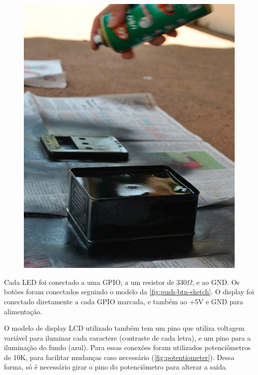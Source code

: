 \documentclass[
		12pt,				%
		openright,			%
		oneside,			%
		a4paper,			%
		chapter=TITLE,		%
		english,			%
		brazil				%
	]{abntex2}
\begin{document}
\begin{figure}[htb]
\begin{minipage}{0.45\textwidth}
		\includegraphics[width=1\textwidth]{img/pintar-2.jpg}
	\end{minipage}
\end{figure}

Cada LED foi conectado a uma GPIO, a um resistor de 330$\Omega$, e ao GND. Os botões foram conectados seguindo o modelo da \autoref{fig:push-btn-sketch}. O display foi conectado diretamente a cada GPIO marcada, e também ao +5V e GND para alimentação. 

O modelo de display LCD utilizado também tem um pino que utiliza voltagem variável para iluminar cada caractere (contraste de cada letra), e um pino para a iluminação do fundo (azul). Para essas conexões foram utilizados potenciômetros de 10K, para facilitar mudanças caso necessário (\autoref{fig:potentiometer}). Dessa forma, só é necessário girar o pino do potenciômetro para alterar a saída.
\end{document}

